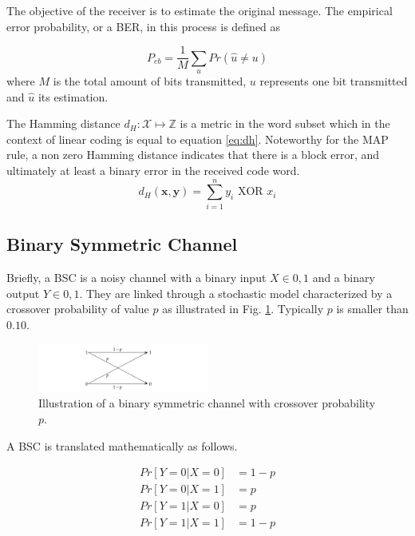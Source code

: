 \documentclass[conference]{IEEEtran}
\begin{document}
The objective of the receiver is to estimate the original message. The empirical error probability, or a BER, in this process is defined as

\begin{equation}
P_{eb} = \frac{1}{M} \underset{u}{\sum}Pr(\hat{u}\neq u)
\end{equation}
where $M$ is the total amount of bits transmitted, $u$ represents one bit transmitted and $\hat{u}$ its estimation.

The Hamming distance $d_H:\mathcal{X}\mapsto \mathbb{Z}$ is a metric in the word subset which in the context of linear coding is equal to equation \ref{eq:dh}. Noteworthy for the MAP rule, a non zero Hamming distance indicates that there is a block error, and ultimately at least a binary error in the received code word.
\begin{equation}\label{eq:dh}
d_H(\textbf{x},\textbf{y}) = \sum_{i=1}^{n} y_i \text{ XOR } x_i 
\end{equation}  

\subsection{Binary Symmetric Channel}

Briefly, a BSC is a noisy channel with a binary input $X\in{0,1}$ and a binary output $Y\in{0,1}$. They are linked through a stochastic model characterized by a crossover probability of value $p$ as illustrated in Fig. \ref{fig:BSC}. Typically $p$ is smaller than $0.10$.


\begin{figure}[!ht]
  \centering
    \includegraphics[width=0.5\textwidth]{images/BSC}
    \caption{Illustration of a binary symmetric channel with crossover probability $p$.}\label{fig:BSC}
\end{figure}

A BSC is translated mathematically as follows.

\begin{align*}
Pr[ Y = 0 | X = 0 ] &= 1 - p \\
Pr[ Y = 0 | X = 1 ] &= p \\
Pr[ Y = 1 | X = 0 ] &= p \\
Pr[ Y = 1 | X = 1 ] &= 1 - p
\end{align*}
\end{document}
